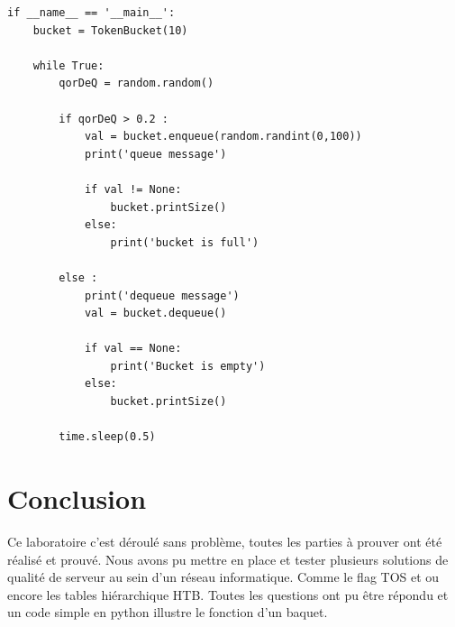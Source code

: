 \documentclass{article}
\begin{document}
\begin{lstlisting}
if __name__ == '__main__':
	bucket = TokenBucket(10)
	
	while True:
		qorDeQ = random.random()
		
		if qorDeQ > 0.2 :
			val = bucket.enqueue(random.randint(0,100))
			print('queue message')
			
			if val != None:
				bucket.printSize()
			else:
				print('bucket is full')
		
		else :
			print('dequeue message')
			val = bucket.dequeue()
		
			if val == None:
				print('Bucket is empty')
			else:
				bucket.printSize()
	
		time.sleep(0.5)
\end{lstlisting}

\section{Conclusion}

Ce laboratoire c'est déroulé sans problème, toutes les parties à prouver ont été réalisé et prouvé. Nous avons pu mettre en place et tester plusieurs solutions de qualité de serveur au sein d'un réseau informatique. Comme le flag TOS et ou encore les tables hiérarchique HTB. Toutes les questions ont pu être répondu et un code simple en python illustre le fonction d'un baquet.

\printbibliography
\end{document}
